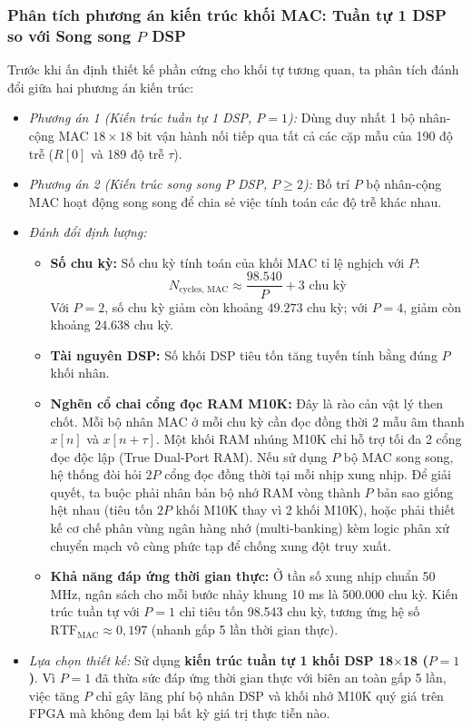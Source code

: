 \subsubsection*{Phân tích phương án kiến trúc khối MAC: Tuần tự 1 DSP so với Song song $P$ DSP}
Trước khi ấn định thiết kế phần cứng cho khối tự tương quan, ta phân tích đánh đổi giữa hai phương án kiến trúc:
\begin{itemize}[leftmargin=1.5em, itemsep=2pt]
    \item \emph{Phương án 1 (Kiến trúc tuần tự 1 DSP, $P = 1$):} Dùng duy nhất 1 bộ nhân-cộng MAC $18 \times 18$ bit vận hành nối tiếp qua tất cả các cặp mẫu của 190 độ trễ ($R[0]$ và 189 độ trễ $\tau$).
    \item \emph{Phương án 2 (Kiến trúc song song $P$ DSP, $P \ge 2$):} Bố trí $P$ bộ nhân-cộng MAC hoạt động song song để chia sẻ việc tính toán các độ trễ khác nhau.
    \item \emph{Đánh đổi định lượng:}
    \begin{itemize}[leftmargin=1.2em, itemsep=2pt]
        \item \textbf{Số chu kỳ:} Số chu kỳ tính toán của khối MAC tỉ lệ nghịch với $P$:
        \begin{equation}
        N_{\text{cycles, MAC}} \approx \frac{98.540}{P} + 3\text{ chu kỳ}
        \end{equation}
        Với $P = 2$, số chu kỳ giảm còn khoảng $49.273$ chu kỳ; với $P = 4$, giảm còn khoảng $24.638$ chu kỳ.
        \item \textbf{Tài nguyên DSP:} Số khối DSP tiêu tốn tăng tuyến tính bằng đúng $P$ khối nhân.
        \item \textbf{Nghẽn cổ chai cổng đọc RAM M10K:} Đây là rào cản vật lý then chốt. Mỗi bộ nhân MAC ở mỗi chu kỳ cần đọc đồng thời 2 mẫu âm thanh $x[n]$ và $x[n+\tau]$. Một khối RAM nhúng M10K chỉ hỗ trợ tối đa 2 cổng đọc độc lập (True Dual-Port RAM). Nếu sử dụng $P$ bộ MAC song song, hệ thống đòi hỏi $2P$ cổng đọc đồng thời tại mỗi nhịp xung nhịp. Để giải quyết, ta buộc phải nhân bản bộ nhớ RAM vòng thành $P$ bản sao giống hệt nhau (tiêu tốn $2P$ khối M10K thay vì 2 khối M10K), hoặc phải thiết kế cơ chế phân vùng ngân hàng nhớ (multi-banking) kèm logic phân xử chuyển mạch vô cùng phức tạp để chống xung đột truy xuất.
        \item \textbf{Khả năng đáp ứng thời gian thực:} Ở tần số xung nhịp chuẩn 50 MHz, ngân sách cho mỗi bước nhảy khung 10 ms là 500.000 chu kỳ. Kiến trúc tuần tự với $P = 1$ chỉ tiêu tốn 98.543 chu kỳ, tương ứng hệ số $\text{RTF}_{\text{MAC}} \approx 0{,}197$ (nhanh gấp 5 lần thời gian thực).
    \end{itemize}
    \item \emph{Lựa chọn thiết kế:} Sử dụng \textbf{kiến trúc tuần tự 1 khối DSP 18$\times$18 ($P = 1$)}. Vì $P = 1$ đã thừa sức đáp ứng thời gian thực với biên an toàn gấp 5 lần, việc tăng $P$ chỉ gây lãng phí bộ nhân DSP và khối nhớ M10K quý giá trên FPGA mà không đem lại bất kỳ giá trị thực tiễn nào.
\end{itemize}

